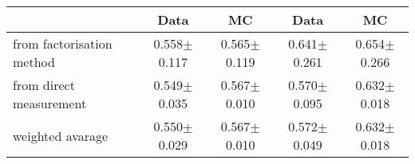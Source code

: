 \begin{table}[hbtp]
\begin{tabular}{l| c c| c c }
    \hline
    & Data & MC & Data & MC \\ 

    \hline
        from factorisation method       &  0.558$\pm$0.117  &  0.565$\pm$0.119      &  0.641$\pm$0.261 &   0.654$\pm$0.266    \\
        from direct measurement       &  0.549$\pm$0.035  &  0.567$\pm$0.010      &  0.570$\pm$0.095 &   0.632$\pm$0.018    \\
        weighted avarage       &  0.550$\pm$0.029  &  0.567$\pm$0.010      &  0.572$\pm$0.049 &   0.632$\pm$0.018    \\


  \end{tabular}
\end{table}


